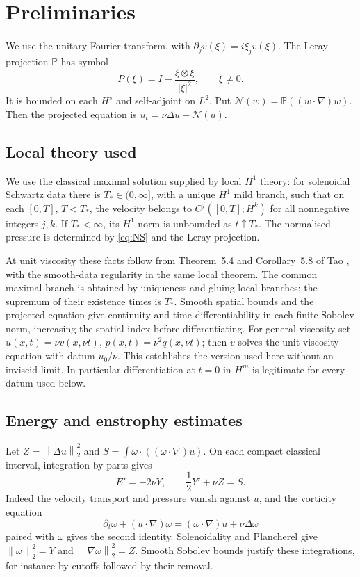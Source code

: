 \documentclass[11pt]{article}
\theoremstyle{remark}
\newcommand{\Pj}{\mathbb P}
\newcommand{\N}{\mathcal N}
\newcommand{\norm}[1]{\left\lVert#1\right\rVert}
\begin{document}
\section{Preliminaries}\label{sec:prelim}
We use the unitary Fourier transform, with $\widehat{\partial_jv}(\xi)=
i\xi_j\widehat v(\xi)$. The Leray projection $\Pj$ has symbol
\begin{equation}
 P(\xi)=I-\frac{\xi\otimes\xi}{|\xi|^2},\qquad \xi\ne0.
 \label{eq:leray}
\end{equation}
It is bounded on each $H^s$ and self-adjoint on $L^2$. Put
$\N(w)=\Pj((w\cdot\nabla)w)$. Then the projected equation is
$u_t=\nu\Delta u-\N(u)$.

\subsection{Local theory used}
We use the classical maximal solution supplied by local $H^1$ theory:
for solenoidal Schwartz data there is $T_*\in(0,\infty]$, with a unique
$H^1$ mild branch, such that on each $[0,T]$, $T<T_*$, the velocity belongs
to $C^j([0,T];H^k)$ for all nonnegative integers $j,k$. If $T_*<\infty$,
its $H^1$ norm is unbounded as $t\uparrow T_*$. The normalised pressure
is determined by \eqref{eq:NS} and the Leray projection.

At unit viscosity these facts follow from Theorem~5.4 and Corollary~5.8
of Tao \cite{TaoLocal}, with the smooth-data regularity in the same local
theorem. The common maximal branch is obtained by uniqueness and gluing
local branches; the supremum of their existence times is $T_*$. Smooth
spatial bounds and the projected equation give continuity and time
differentiability in each finite Sobolev norm, increasing the spatial
index before differentiating. For general viscosity set
$u(x,t)=\nu v(x,\nu t)$, $p(x,t)=\nu^2q(x,\nu t)$; then $v$ solves the
unit-viscosity equation with datum $u_0/\nu$. This establishes the version
used here without an inviscid limit. In particular differentiation at
$t=0$ in $H^m$ is legitimate for every datum used below.

\subsection{Energy and enstrophy estimates}
Let $Z=\norm{\Delta u}_2^2$ and
$S=\int\omega\cdot((\omega\cdot\nabla)u)$. On each compact classical
interval, integration by parts gives
\begin{equation}
 E'=-2\nu Y,\qquad \frac12Y'+\nu Z=S.\label{eq:balances}
\end{equation}
Indeed the velocity transport and pressure vanish against $u$, and the
vorticity equation
\begin{equation}
 \partial_t\omega+(u\cdot\nabla)\omega
       =(\omega\cdot\nabla)u+\nu\Delta\omega\label{eq:vorticity}
\end{equation}
paired with $\omega$ gives the second identity. Solenoidality and
Plancherel give $\norm\omega_2^2=Y$ and
$\norm{\nabla\omega}_2^2=Z$. Smooth Sobolev bounds justify these integrations,
for instance by cutoffs followed by their removal.
\end{document}
